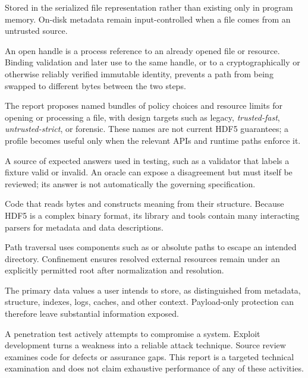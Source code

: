 \documentclass[../main.tex]{subfiles}
\begin{document}
\begin{description}[leftmargin=1.5em,style=nextline]
\item[On-disk.]
Stored in the serialized file representation rather than existing only in
program memory. On-disk metadata remain input-controlled when a file comes from
an untrusted source.

\item[Open handle / immutable file identity.]
An open handle is a process reference to an already opened file or resource.
Binding validation and later use to the same handle, or to a cryptographically
or otherwise reliably verified immutable identity, prevents a path from being
swapped to different bytes between the two steps.

\item[Open or processing profile.]
The report proposes named bundles of policy choices and resource limits for
opening or processing a file, with design targets such as legacy,
\emph{trusted-fast}, \emph{untrusted-strict}, or forensic. These names are not
current HDF5 guarantees; a profile becomes useful only when the relevant APIs
and runtime paths enforce it.

\item[Oracle.]
A source of expected answers used in testing, such as a validator that labels a
fixture valid or invalid. An oracle can expose a disagreement but must itself
be reviewed; its answer is not automatically the governing specification.

\item[Parser.]
Code that reads bytes and constructs meaning from their structure. Because
HDF5 is a complex binary format, its library and tools contain many interacting
parsers for metadata and data descriptions.

\item[Path traversal / path confinement.]
Path traversal uses components such as  or absolute paths to escape an
intended directory. Confinement ensures resolved external resources remain
under an explicitly permitted root after normalization and resolution.

\item[Payload.]
The primary data values a user intends to store, as distinguished from
metadata, structure, indexes, logs, caches, and other context. Payload-only
protection can therefore leave substantial information exposed.

\item[Penetration test / exploit development / source review.]
A penetration test actively attempts to compromise a system. Exploit
development turns a weakness into a reliable attack technique. Source review
examines code for defects or assurance gaps. This report is a targeted
technical examination and does not claim exhaustive performance of any of
these activities.


\end{description}
\end{document}
